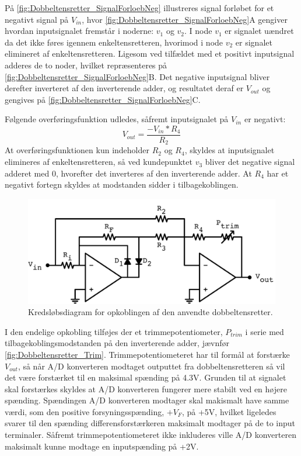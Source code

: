 \noindent
%
På \autoref{fig:Dobbeltensretter_SignalForloebNeg} illustreres signal forløbet  for et negativt signal på $V_{in}$, hvor \autoref{fig:Dobbeltensretter_SignalForloebNeg}A gengiver hvordan inputsignalet fremstår i noderne: $v_1$ og $v_2$. I node $v_1$ er signalet uændret da det ikke føres igennem enkeltensretteren, hvorimod i node $v_2$ er signalet elimineret af enkeltensretteren. Ligesom ved tilfældet med et positivt inputsignal adderes de to noder, hvilket repræsenteres på \autoref{fig:Dobbeltensretter_SignalForloebNeg}B. Det negative inputsignal bliver derefter inverteret af den inverterende adder, og resultatet deraf er $V_{out}$ og gengives på \autoref{fig:Dobbeltensretter_SignalForloebNeg}C.

Følgende overføringsfunktion udledes, såfremt inputsignalet på $V_{in}$ er negativt: 
%
\begin{equation}
	V_{out} =  \frac{-V_{in}*R_4}{R_2}
\end{equation}
%
At overføringsfunktionen kun indeholder $R_2$ og $R_4$, skyldes at inputsignalet elimineres af enkeltensretteren, så ved kundepunktet $v_3$ bliver det negative signal adderet med 0, hvorefter det inverteres af den inverterende adder. At $R_4$ har et negativt fortegn skyldes at modstanden sidder i tilbagekoblingen. 
%  
\begin{figure}[H]
	\centering
	\includegraphics[resolution=300,scale=\circuitSize]{Figure/Circuits/Dobbeltensretter_Trim.pdf}
	\caption{Kredsløbsdiagram for opkoblingen af den anvendte dobbeltensretter.}
	\label{fig:Dobbeltensretter_Trim}
\end{figure}
\noindent
%
I den endelige opkobling tilføjes der et trimmepotentiometer, $P_{trim}$ i serie med tilbagekoblingsmodstanden på den inverterende adder, jævnfør \autoref{fig:Dobbeltensretter_Trim}. Trimmepotentiometeret har til formål at forstærke $V_{out}$, så når A/D konverteren modtaget outputtet fra dobbeltensretteren så vil det være forstærket til en maksimal spænding på 4.3V. Grunden til at signalet skal forstærkes skyldes at A/D konverteren fungerer mere stabilt ved en højere spænding. Spændingen A/D konverteren modtager skal makismalt have samme værdi, som den positive forsyningsspænding, $+V_F$, på +5V, hvilket ligeledes svarer til den spænding differensforstærkeren maksimalt modtager på de to input terminaler. Såfremt trimmepotentiometeret ikke inkluderes ville A/D konverteren maksimalt kunne modtage en inputspænding på +2V.\\[5mm]

